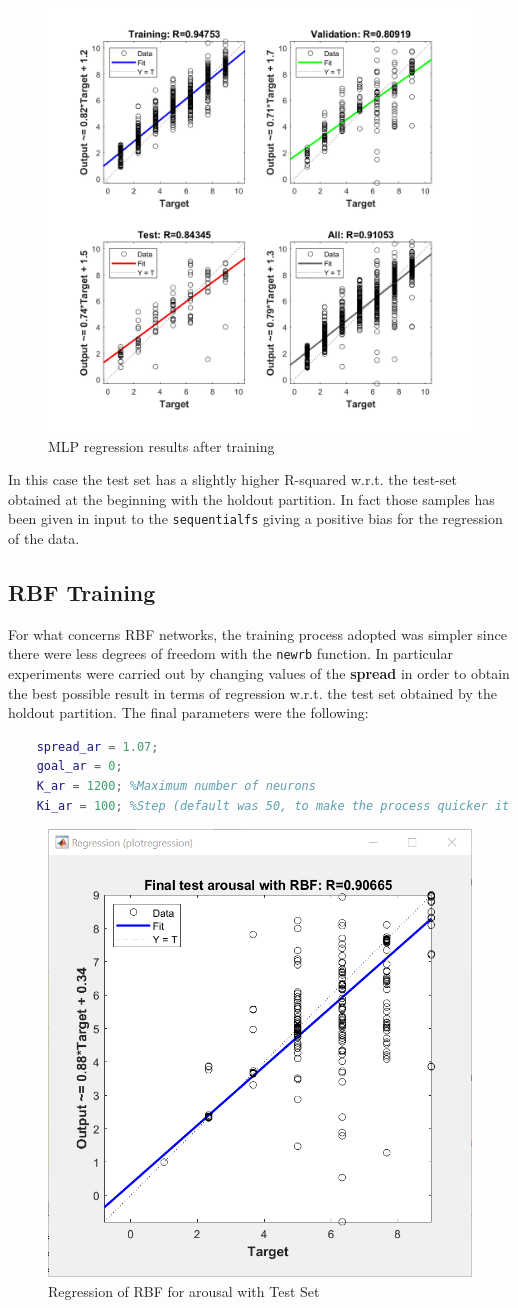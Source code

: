 \begin{figure}[H]
	\centering
	\includegraphics[width=0.7\linewidth]{img/arousal_mlp_45_regression.png} 
	\caption{MLP regression results after training}
\end{figure}

In this case the test set has a slightly higher R-squared w.r.t. the test-set obtained at the beginning with the holdout partition. In fact those samples has been given in input to the \verb|sequentialfs| giving a positive bias for the regression of the data.

\subsection{RBF Training}
For what concerns RBF networks, the training process adopted was simpler since there were less degrees of freedom with the \verb|newrb| function. In particular experiments were carried out by changing values of the \textbf{spread} in order to obtain the best possible result in terms of regression w.r.t. the test set obtained by the holdout partition. The final parameters were the following:
\begin{lstlisting}[language=Matlab]
	%Parameters for training the RBF for arousal
	spread_ar = 1.07;
	goal_ar = 0;
	K_ar = 1200; %Maximum number of neurons
	Ki_ar = 100; %Step (default was 50, to make the process quicker it was increased)
\end{lstlisting}

\begin{figure}[H]
	\centering
	\includegraphics[width=0.5\linewidth]{img/arousal_rbf_1_3.png}
	\caption{Regression of RBF for arousal with Test Set}
\end{figure}

